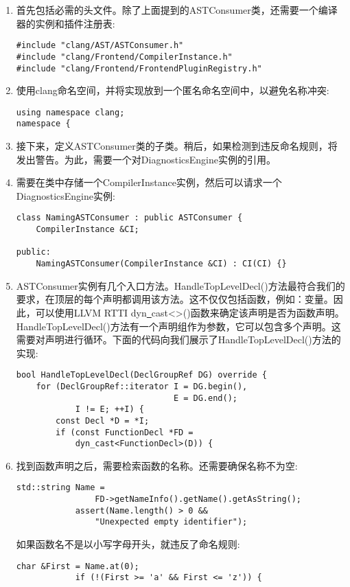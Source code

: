 \begin{enumerate}
\item 首先包括必需的头文件。除了上面提到的ASTConsumer类，还需要一个编译器的实例和插件注册表:
\begin{lstlisting}[caption={}]
#include "clang/AST/ASTConsumer.h"
#include "clang/Frontend/CompilerInstance.h"
#include "clang/Frontend/FrontendPluginRegistry.h"
\end{lstlisting}

\item 使用clang命名空间，并将实现放到一个匿名命名空间中，以避免名称冲突:
\begin{lstlisting}[caption={}]
using namespace clang;
namespace {
\end{lstlisting}

\item 接下来，定义ASTConsumer类的子类。稍后，如果检测到违反命名规则，将发出警告。为此，需要一个对DiagnosticsEngine实例的引用。

\item 需要在类中存储一个CompilerInstance实例，然后可以请求一个DiagnosticsEngine实例:
\begin{lstlisting}[caption={}]
class NamingASTConsumer : public ASTConsumer {
	CompilerInstance &CI;
	
public:
	NamingASTConsumer(CompilerInstance &CI) : CI(CI) {}
\end{lstlisting}

\item ASTConsumer实例有几个入口方法。HandleTopLevelDecl()方法最符合我们的要求，在顶层的每个声明都调用该方法。这不仅仅包括函数，例如：变量。因此，可以使用LLVM RTTI dyn\underline{~}cast<>()函数来确定该声明是否为函数声明。HandleTopLevelDecl()方法有一个声明组作为参数，它可以包含多个声明。这需要对声明进行循环。下面的代码向我们展示了HandleTop\allowbreak LevelDecl()方法的实现:
\begin{lstlisting}[caption={}]
bool HandleTopLevelDecl(DeclGroupRef DG) override {
	for (DeclGroupRef::iterator I = DG.begin(),
								E = DG.end();
			I != E; ++I) {
		const Decl *D = *I;
		if (const FunctionDecl *FD =
			dyn_cast<FunctionDecl>(D)) {
\end{lstlisting}

\item 找到函数声明之后，需要检索函数的名称。还需要确保名称不为空:
\begin{lstlisting}[caption={}]
			std::string Name =
				FD->getNameInfo().getName().getAsString();
			assert(Name.length() > 0 &&
				"Unexpected empty identifier");
\end{lstlisting}
如果函数名不是以小写字母开头，就违反了命名规则:
\begin{lstlisting}[caption={}]
			char &First = Name.at(0);
			if (!(First >= 'a' && First <= 'z')) {
\end{lstlisting}


\end{enumerate}
